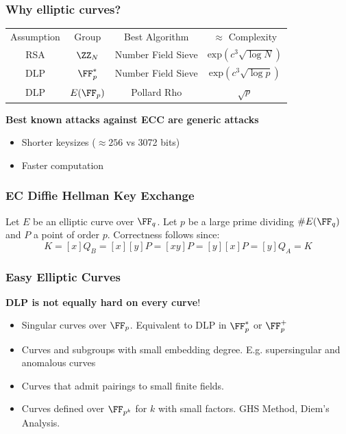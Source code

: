 \documentclass{beamer}
\begin{document}
\begin{frame}
    \frametitle{Why elliptic curves?}
    \pause
    \begin{center}
        \begin{tabular}{c c c c}
            Assumption & Group   & Best Algorithm & $\approx$ Complexity \\
            RSA        & $\ZZ_N$ & Number Field Sieve & $\mathrm{exp}(c ^3\sqrt{\log N})$ \\
            DLP        & $\FF^*_p$ & Number Field Sieve & $\mathrm{exp}(c ^3\sqrt{\log p})$ \\
            DLP        & $E(\FF_p)$ & Pollard Rho & $\sqrt{p}$ \\
        \end{tabular}
    \end{center}
    \pause
    \textbf{Best known attacks against ECC are generic attacks}
    \pause
    \begin{itemize}
        \item Shorter keysizes ($\approx 256$ vs 3072 bits)
        \item Faster computation
    \end{itemize}
\end{frame}

\begin{frame}
    \frametitle{EC Diffie Hellman Key Exchange}
    Let $E$ be an elliptic curve over $\FF_q$. Let $p$ be a large prime dividing $\#E(\FF_q)$ and $P$ a point of order $p$. 
    \pause
    \pause
    Correctness follows since:
    \[ K = [x]Q_B = [x][y]P = [xy]P = [y][x]P = [y]Q_A = K \]

\end{frame}

\begin{frame}
    \frametitle{Easy Elliptic Curves}
    \textbf{DLP is not equally hard on every curve}!
    \begin{itemize}
        \item<1-> Singular curves over $\FF_p$. Equivalent to DLP in $\FF_p^*$ or $\FF_p^+$
        \item<2-> Curves and subgroups with small embedding degree. E.g. supersingular and anomalous curves
        \item<3-> Curves that admit pairings to small finite fields.
        \item<4-> Curves defined over $\FF_{p^k}$ for $k$ with small factors. GHS Method, Diem's Analysis.
    \end{itemize}
\end{frame}
\end{document}
